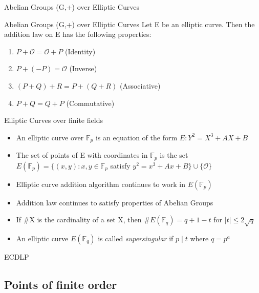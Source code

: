 \documentclass{beamer}
\begin{document}
\begin{frame}{Abelian Groups (G,+) over Elliptic Curves}
\end{frame}

\begin{frame}{Abelian Groups (G,+) over Elliptic Curves}
	Let E be an elliptic curve. Then the addition law on E has the following properties:
	\begin{enumerate}
		\item $P + \mathcal{O} = \mathcal{O} + P$ (Identity)
		\item $P + (-P) = \mathcal{O}$ (Inverse)
		\item $(P + Q) + R = P + (Q + R) $ (Associative)
		\item $P + Q = Q + P$ (Commutative)
	\end{enumerate}
\end{frame}


\begin{frame}{Elliptic Curves over finite fields}
	\begin{itemize}
		\item An elliptic curve over $\mathbb{F}_p$ is an equation of the form $E:Y^2=X^3+AX+B$
		\item The set of points of E with coordinates in $\mathbb{F}_p$ is the set $E(\mathbb{F}_p)=\{(x,y):x,y\in \mathbb{F}_p$ satisfy $y^2=x^3+Ax+B \} \cup \{\mathcal{O}\}$
		\item Elliptic curve addition algorithm continues to work in $E(\mathbb{F}_p)$
		\item Addition law continues to satisfy properties of Abelian Groups
		\item If \#X is the cardinality of a set X, then \#$E(\mathbb{F}_q) = q+1-t$ for $|t|\leq 2\sqrt{q}$
		\item An elliptic curve $E(\mathbb{F}_q)$ is called \textit{supersingular} if $p \mid t$ where $q=p^a$
	\end{itemize}
\end{frame}

\begin{frame}{ECDLP}
\end{frame}

\subsection{Points of finite order}
\end{document}
